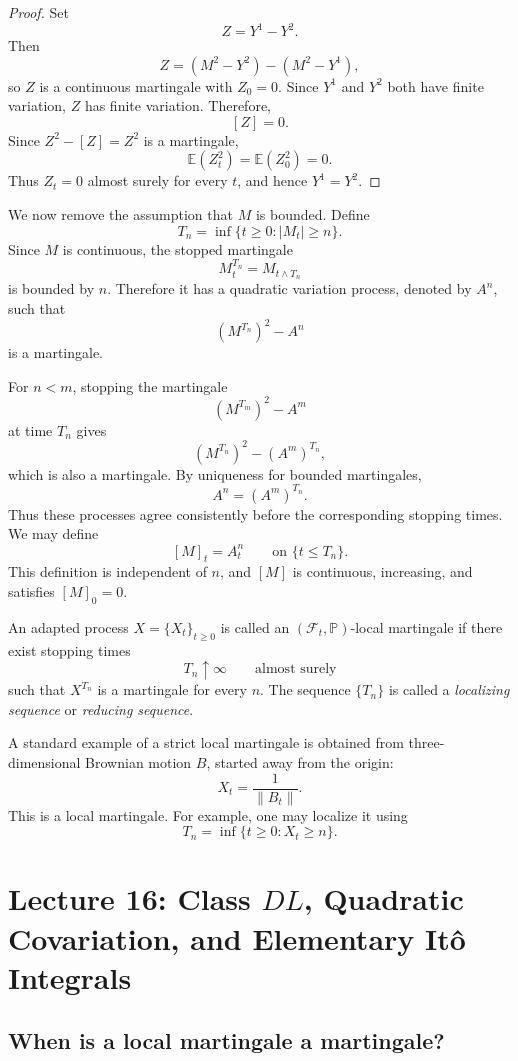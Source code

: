 \begin{proof}
Set
\[
Z=Y^1-Y^2.
\]
Then
\[
Z=(M^2-Y^2)-(M^2-Y^1),
\]
so \(Z\) is a continuous martingale with \(Z_0=0\). Since \(Y^1\) and \(Y^2\) both have finite variation, \(Z\) has finite variation. Therefore,
\[
[Z]=0.
\]
Since \(Z^2-[Z]=Z^2\) is a martingale,
\[
\mathbb E(Z_t^2)=\mathbb E(Z_0^2)=0.
\]
Thus \(Z_t=0\) almost surely for every \(t\), and hence \(Y^1=Y^2\).
\end{proof}

We now remove the assumption that \(M\) is bounded. Define
\[
T_n=\inf\{t\ge0:|M_t|\ge n\}.
\]
Since \(M\) is continuous, the stopped martingale
\[
M^{T_n}_t=M_{t\wedge T_n}
\]
is bounded by \(n\). Therefore it has a quadratic variation process, denoted by \(A^n\), such that
\[
(M^{T_n})^2-A^n
\]
is a martingale.

For \(n<m\), stopping the martingale
\[
(M^{T_m})^2-A^m
\]
at time \(T_n\) gives
\[
(M^{T_n})^2-(A^m)^{T_n},
\]
which is also a martingale. By uniqueness for bounded martingales,
\[
A^n=(A^m)^{T_n}.
\]
Thus these processes agree consistently before the corresponding stopping times. We may define
\[
[M]_t=A^n_t
\qquad\text{on } \{t\le T_n\}.
\]
This definition is independent of \(n\), and \([M]\) is continuous, increasing, and satisfies \([M]_0=0\).

\begin{definition}
An adapted process \(X=\{X_t\}_{t\ge0}\) is called an
\((\mathcal F_t,\mathbb P)\)-local martingale if there exist stopping times
\[
T_n\uparrow\infty
\qquad\text{almost surely}
\]
such that \(X^{T_n}\) is a martingale for every \(n\). The sequence
\(\{T_n\}\) is called a \emph{localizing sequence} or \emph{reducing sequence}.
\end{definition}

A standard example of a strict local martingale is obtained from three-dimensional Brownian motion \(B\), started away from the origin:
\[
X_t=\frac{1}{\|B_t\|}.
\]
This is a local martingale. For example, one may localize it using
\[
T_n=\inf\{t\ge0:X_t\ge n\}.
\]
\section*{Lecture 16: Class \texorpdfstring{$DL$}{DL}, Quadratic Covariation, and Elementary It\^o Integrals}

\subsection*{When is a local martingale a martingale?}

